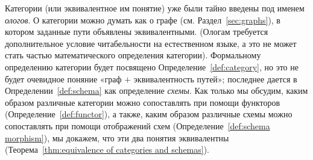 \documentclass[../main/CT4S-EN-RU]{subfiles}
\begin{document}
\begin{blockRUS}
Категории (или эквивалентное им понятие) уже были тайно введены под именем {\em ологов}. О категории можно думать как о графе (см. Раздел~\ref{sec:graphs}), в котором заданные пути объявлены эквивалентными. (Ологам требуется дополнительное условие читабельности на естественном языке, а это не может стать частью математического определения категории). Формальному определению категории будет посвящено Определение~\ref{def:category}, но это не будет очевидное поняние «граф $+$ эквивалентность путей»; последнее дается в Определении~\ref{def:schema} как определение {\em схемы}. Как только мы обсудим, каким образом различные категории можно сопоставлять при помощи функторов (Определение~\ref{def:functor}), а также, каким образом различные схемы можно сопоставлять при помощи отображений схем (Определение~\ref{def:schema morphism}), мы докажем, что эти два понятия эквивалентны (Теорема~\ref{thm:equivalence of categories and schemas}).
\end{blockRUS}
\end{document}

